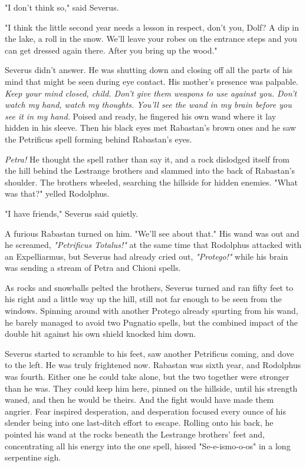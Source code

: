 \documentclass[a4paper,11pt]{article}
\begin{document}
"I don't think so," said Severus.

"I think the little second year needs a lesson in respect, don't you, Dolf? A dip in the lake, a roll in the snow. We'll leave your robes on the entrance steps and you can get dressed again there. After you bring up the wood."

Severus didn't answer. He was shutting down and closing off all the parts of his mind that might be seen during eye contact. His mother's presence was palpable. \emph{Keep your mind closed, child. Don't give them weapons to use against you. Don't watch my hand, watch my thoughts. You'll see the wand in my brain before you see it in my hand.} Poised and ready, he fingered his own wand where it lay hidden in his sleeve. Then his black eyes met Rabastan's brown ones and he saw the Petrificus spell forming behind Rabastan's eyes.

\emph{Petra!} He thought the spell rather than say it, and a rock dislodged itself from the hill behind the Lestrange brothers and slammed into the back of Rabastan's shoulder. The brothers wheeled, searching the hillside for hidden enemies. "What was that?" yelled Rodolphus.

"I have friends," Severus said quietly.

A furious Rabastan turned on him. "We'll see about that." His wand was out and he screamed, \emph{"Petrificus Totalus!"} at the same time that Rodolphus attacked with an Expelliarmus, but Severus had already cried out, \emph{"Protego!"} while his brain was sending a stream of Petra and Chioni spells.

As rocks and snowballs pelted the brothers, Severus turned and ran fifty feet to his right and a little way up the hill, still not far enough to be seen from the windows. Spinning around with another Protego already spurting from his wand, he barely managed to avoid two Pugnatio spells, but the combined impact of the double hit against his own shield knocked him down.

Severus started to scramble to his feet, saw another Petrificus coming, and dove to the left. He was truly frightened now. Rabastan was sixth year, and Rodolphus was fourth. Either one he could take alone, but the two together were stronger than he was. They could keep him here, pinned on the hillside, until his strength waned, and then he would be theirs. And the fight would have made them angrier. Fear inspired desperation, and desperation focused every ounce of his slender being into one last-ditch effort to escape. Rolling onto his back, he pointed his wand at the rocks beneath the Lestrange brothers' feet and, concentrating all his energy into the one spell, hissed "Se-e-ismo-o-os" in a long serpentine sigh.
\end{document}
